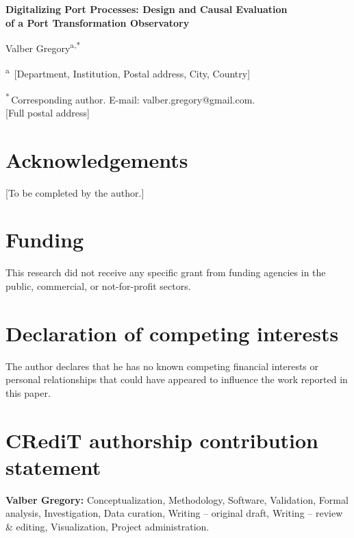 \documentclass[12pt,a4paper]{article}
\begin{document}
\begin{center}
{\Large\bfseries Digitalizing Port Processes: Design and Causal Evaluation\\
of a Port Transformation Observatory}

\vspace{1em}
Valber Gregory\textsuperscript{a,*}

\vspace{0.5em}
\textsuperscript{a}\,%
{[Department, Institution, Postal address, City, Country]}

\textsuperscript{*}\,Corresponding author. E-mail: valber.gregory@gmail.com.\\
{[Full postal address]}
\end{center}

\section*{Acknowledgements}
[To be completed by the author.]

\section*{Funding}
This research did not receive any specific grant from funding agencies in the
public, commercial, or not-for-profit sectors.

\section*{Declaration of competing interests}
The author declares that he has no known competing financial interests or
personal relationships that could have appeared to influence the work reported
in this paper.

\section*{CRediT authorship contribution statement}
\textbf{Valber Gregory:} Conceptualization, Methodology, Software, Validation,
Formal analysis, Investigation, Data curation, Writing -- original draft,
Writing -- review \& editing, Visualization, Project administration.
\end{document}
